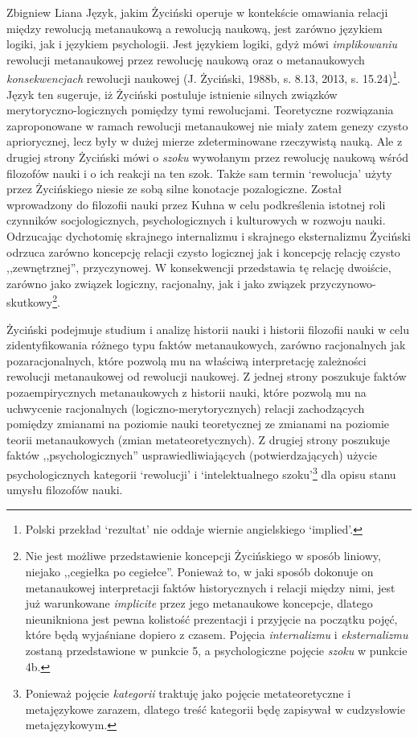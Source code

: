 \begin{artplenv}{Zbigniew Liana}
Język, jakim Życiński operuje w kontekście omawiania relacji między rewolucją metanaukową a rewolucją naukową, jest
zarówno językiem logiki, jak i językiem psychologii. Jest językiem logiki, gdyż mówi \textit{implikowaniu} rewolucji
metanaukowej przez rewolucję naukową oraz o metanaukowych \textit{konsekwencjach} rewolucji naukowej
\label{ref:RND7WtbaMWBYd}(J. Życiński, 1988b, s. 8.13, 2013, s. 15.24)\footnote{Polski przekład ‘rezultat’ nie oddaje
	wiernie angielskiego ‘implied’.}. Język ten sugeruje, iż Życiński postuluje istnienie silnych związków
merytoryczno-logicznych pomiędzy tymi rewolucjami. Teoretyczne rozwiązania zaproponowane w ramach rewolucji
metanaukowej nie miały zatem genezy czysto apriorycznej, lecz były w dużej mierze  zdeterminowane rzeczywistą nauką.
Ale z drugiej strony Życiński mówi o \textit{szoku }wywołanym przez rewolucję naukową wśród filozofów nauki i o ich
reakcji na ten szok. Także sam termin ‘rewolucja’ użyty przez Życińskiego niesie ze sobą silne konotacje pozalogiczne.
Został wprowadzony do filozofii nauki przez Kuhna w celu podkreślenia istotnej roli czynników socjologicznych,
psychologicznych i kulturowych w rozwoju nauki. Odrzucając dychotomię skrajnego internalizmu i skrajnego eksternalizmu
Życiński odrzuca zarówno koncepcję relacji czysto logicznej jak i koncepcję relację czysto ,,zewnętrznej'', przyczynowej.
W konsekwencji przedstawia tę relację dwoiście, zarówno jako związek logiczny, racjonalny, jak i jako związek
przyczynowo-skutkowy\footnote{Nie jest możliwe przedstawienie koncepcji Życińskiego w sposób liniowy, niejako ,,cegiełka
	po cegiełce''. Ponieważ to, w jaki sposób dokonuje on metanaukowej interpretacji faktów historycznych i relacji między
	nimi, jest już warunkowane \textit{implicite} przez jego metanaukowe koncepcje, dlatego nieunikniona jest pewna kolistość
	prezentacji i przyjęcie na początku pojęć, które będą wyjaśniane dopiero z czasem. Pojęcia \textit{internalizmu} i
	\textit{eksternalizmu} zostaną przedstawione w punkcie 5, a psychologiczne pojęcie \textit{szoku} w punkcie 4b.}.

Życiński podejmuje studium i analizę historii nauki i historii filozofii nauki w celu zidentyfikowania różnego typu
faktów metanaukowych, zarówno racjonalnych jak pozaracjonalnych, które pozwolą mu na właściwą interpretację zależności
rewolucji metanaukowej od rewolucji naukowej. Z jednej strony poszukuje faktów pozaempirycznych metanaukowych z
historii nauki, które pozwolą mu na uchwycenie racjonalnych (logiczno-merytorycznych) relacji zachodzących pomiędzy
zmianami na poziomie nauki teoretycznej ze zmianami na poziomie teorii metanaukowych (zmian metateoretycznych). Z
drugiej strony poszukuje faktów ,,psychologicznych'' usprawiedliwiających (potwierdzających) użycie psychologicznych
kategorii ‘rewolucji’ i ‘intelektualnego szoku’\footnote{Ponieważ pojęcie \textit{kategorii} traktuję jako pojęcie
	metateoretyczne i metajęzykowe zarazem, dlatego treść kategorii będę zapisywał w cudzysłowie metajęzykowym.} dla opisu
stanu umysłu filozofów nauki.


\end{artplenv}
